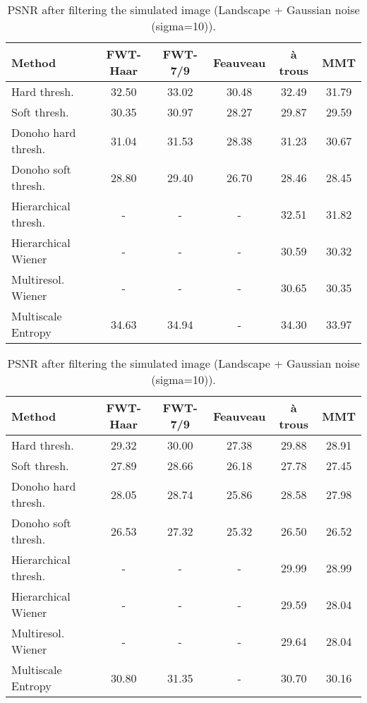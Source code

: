 \begin{table}[hbt]
\begin{center}
\begin{tabular}{lccccc} \hline \hline
Method               & FWT-Haar  & FWT-7/9    & Feauveau & \`a trous & MMT \\ \hline \hline
Hard thresh.         & 32.50 & 33.02 &  30.48   &   32.49  & 31.79 \\
Soft thresh.         & 30.35 & 30.97 &  28.27   &   29.87  & 29.59  \\
Donoho hard thresh.  & 31.04 & 31.53 &  28.38   &   31.23  & 30.67  \\
Donoho soft thresh.  & 28.80 & 29.40 &  26.70   &   28.46  &  28.45  \\
Hierarchical thresh. &     - &  -    &   -      &   32.51  &  31.82  \\
Hierarchical Wiener  &     - &  -    &   -      &   30.59  &  30.32  \\
Multiresol. Wiener   &     - &  -    &   -      &   30.65  &  30.35  \\
Multiscale Entropy   & 34.63 & 34.94 &   -      &   34.30  &  33.97  \\ \hline \hline
\end{tabular}
\caption{PSNR after filtering the simulated image (Landscape + Gaussian noise (sigma=5)).}
\vspace{0.5cm}


\begin{tabular}{lccccc} \hline \hline
Method               & FWT-Haar  & FWT-7/9    & Feauveau & \`a trous & MMT \\ \hline \hline
Hard thresh.         & 29.32 & 30.00 &  27.38   &  29.88   &  28.91 \\
Soft thresh.         & 27.89 & 28.66 &  26.18   &  27.78   &  27.45 \\
Donoho hard thresh.  & 28.05 & 28.74 &  25.86   &  28.58   &  27.98  \\
Donoho soft thresh.  & 26.53 & 27.32 &  25.32   &  26.50   &  26.52  \\
Hierarchical thresh. &     - &  -    &   -      &  29.99   &  28.99  \\
Hierarchical Wiener  &     - &  -    &   -      &  29.59   &  28.04  \\
Multiresol. Wiener   &     - &  -    &   -      &  29.64   &  28.04  \\
Multiscale Entropy   & 30.80 &  31.35 &   -     &  30.70   &  30.16 \\ \hline \hline
\end{tabular}
\caption{PSNR after filtering the simulated image (Landscape + Gaussian noise (sigma=10)).}
\vspace{0.5cm}



\end{center}
\end{table}
